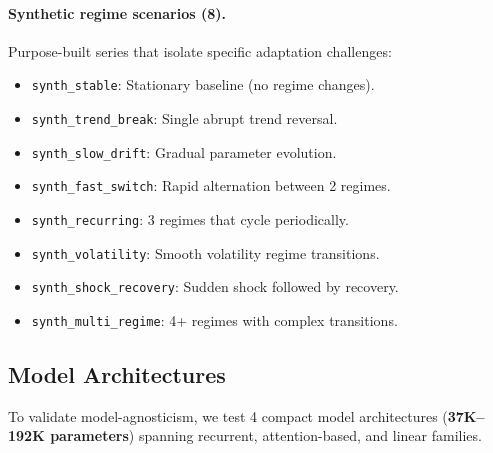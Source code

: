 \documentclass[journal]{IEEEtran}
\begin{document}
\paragraph{Synthetic regime scenarios (8).} Purpose-built series that isolate specific adaptation challenges:
\begin{itemize}[nosep]
  \item \texttt{synth\_stable}: Stationary baseline (no regime changes).
  \item \texttt{synth\_trend\_break}: Single abrupt trend reversal.
  \item \texttt{synth\_slow\_drift}: Gradual parameter evolution.
  \item \texttt{synth\_fast\_switch}: Rapid alternation between 2 regimes.
  \item \texttt{synth\_recurring}: 3 regimes that cycle periodically.
  \item \texttt{synth\_volatility}: Smooth volatility regime transitions.
  \item \texttt{synth\_shock\_recovery}: Sudden shock followed by recovery.
  \item \texttt{synth\_multi\_regime}: 4+ regimes with complex transitions.
\end{itemize}

\subsection{Model Architectures}

To validate model-agnosticism, we test 4 compact model architectures (\textbf{37K--192K parameters}) spanning recurrent, attention-based, and linear families.

\begin{table}[t]
\centering
\caption{Model architectures used in experiments. All policies use the same model per experiment.}
\label{tab:models}
\small
{}%
\end{table}
\end{document}
